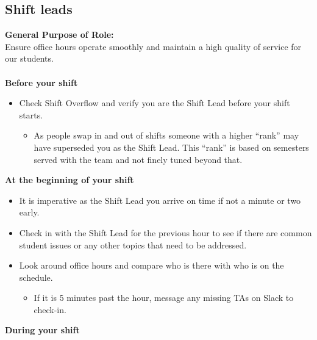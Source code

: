 \documentclass[a4paper]{article}
\begin{document}
\subsection{Shift leads}
\textbf{General Purpose of Role:} \\
Ensure office hours operate smoothly and maintain a high quality of service for our students.\\
\\
\textbf{Before your shift}
\begin{itemize}
\item Check Shift Overflow and verify you are the Shift Lead before your shift starts. 
\begin{itemize}
\item As people swap in and out of shifts someone with a higher “rank” may have superseded you as the Shift Lead. This “rank” is based on semesters served with the team and not finely tuned beyond that.
\end{itemize}
\end{itemize}
\textbf{At the beginning of your shift}
\begin{itemize}
\item It is imperative as the Shift Lead you arrive on time if not a minute or two early.
\item Check in with the Shift Lead for the previous hour to see if there are common student issues or any other topics that need to be addressed.
\item Look around office hours and compare who is there with who is on the schedule.
\begin{itemize}
\item If it is 5 minutes past the hour, message any missing TAs on Slack to check-in.
\end{itemize}
\end{itemize}
\textbf{During your shift}
\end{document}

